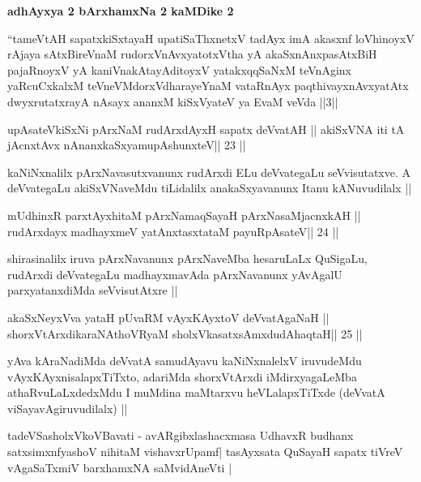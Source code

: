 \medskip
\centerline{\textbf{adhAyxya 2 bArxhamxNa 2 kaMDike 2}}

\begin{artha}
``tameVtAH sapatxkiSxtayaH upatiSaThxnetxV tadAyx imA akasxnf
  loVhinoyxV rAjaya sAtxBireVnaM rudorxV\s nAvxyatotxV\s tha yA
  akaSxnAnxpasAtxBiH pajaRnoyxV yA kaniVnakAtayA\s ditoyxV
  yatakxqqSaNxM teVnAginx yaRcuCxkalxM teVneVMdorxV\s dharayeYnaM
  vataRnAyx paqthivayxnAvxyatAtx dwyxrutatxrayA nAsayx ananxM
  kiSxVyateV ya EvaM veVda ||3|| 
\end{artha}


\begin{shl}
upAsateV\s kiSxNi pArxNaM rudArxdAyxH sapatx deVvatAH ||
akiSxVNA iti tA jAcnxtAvx nAnanxkaSxyamupAshunxteV\hfill || 23 ||
\end{shl}

\begin{artha}
kaNiNxnalilx pArxNavasutxvanunx rudArxdi ELu deVvategaLu
seVvisutatxve. A deVvategaLu akiSxVNaveMdu tiLidalilx anakaSxyavanunx
Itanu kANuvudilalx ||
\end{artha}

\begin{shl}
mUdhinxR parxtAyxhitaM pArxNamaqSayaH pArxNasaMjacnxkAH ||
rudArxdayx madhayxmeV yatAnxtasxtataM payuRpAsateV\hfill || 24 ||
\end{shl}

\begin{artha}
shirasinalilx iruva pArxNavanunx pArxNaveMba hesaruLaLx QuSigaLu,
rudArxdi deVvategaLu madhayxmavAda pArxNavanunx yAvAgalU
parxyatanxdiMda seVvisutAtxre ||
\end{artha}

\begin{shl}
akaSxNeyxVva yataH pUvaRM vAyxKAyxtoV deVvatAgaNaH ||
shorxVtArxdikaraNAthoVR\s yaM sholxVkasatxsAmxdudAhaqtaH\hfill || 25 ||
\end{shl}

\begin{artha}
yAva kAraNadiMda deVvatA samudAyavu kaNiNxnalelxV iruvudeMdu
vAyxKAyxnisalapxTiTxto, adariMda shorxVtArxdi iMdirxyagaLeMba
athaRvuLaLxdedxMdu I muMdina maMtarxvu heVLalapxTiTxde (deVvatA
viSayavAgiruvudilalx) ||
\end{artha}


\begin{artha}
tadeVSasholxVkoVBavati - avARgibxlashacxmasa UdhavxR budhanx
satxsimxnfyashoV  nihitaM vishavxrUpamf| tasAyx\s\s sata QuSayaH
sapatx tiVreV vAgaSaTxmiV barxhamxNA saMvidAneVti |
\end{artha}

